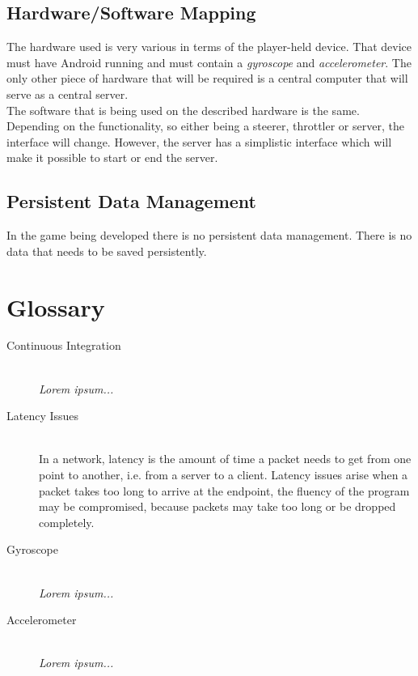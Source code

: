 \documentclass[11pt,twoside,a4paper]{article}
\begin{document}
\subsection{Hardware/Software Mapping}
The hardware used is very various in terms of the player-held device. That device must have Android running and must contain a \emph{gyroscope} and \emph{accelerometer}. The only other piece of hardware that will be required is a central computer that will serve as a central server. \\
The software that is being used on the described hardware is the same. Depending on the functionality, so either being a steerer, throttler or server, the interface will change. However, the server has a simplistic interface which will make it possible to start or end the server.


\subsection{Persistent Data Management}
In the game being developed there is no persistent data management. There is no data that needs to be saved persistently. 

\newpage

\section{Glossary}
\begin{description}
\item[Continuous Integration] \hfill \\
\emph{Lorem ipsum...}
\item[Latency Issues] \hfill \\
In a network, latency is the amount of time a packet needs to get from one point to another, i.e. from a server to a client. Latency issues arise when a packet takes too long to arrive at the endpoint, the fluency of the program may be compromised, because packets may take too long or be dropped completely. 
\item[Gyroscope] \hfill \\
\emph{Lorem ipsum...}
\item[Accelerometer] \hfill \\
\emph{Lorem ipsum...}
\end{description}
\end{document}
